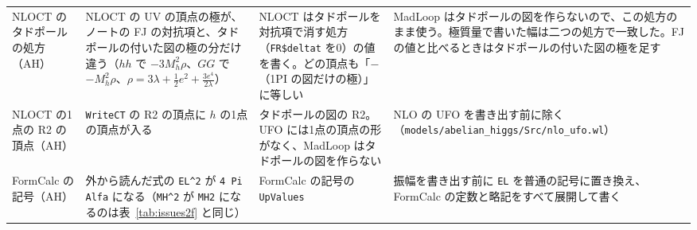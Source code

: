 \documentclass[a4paper,10pt]{ltjsarticle}
\begin{document}
\begin{table}[tbp]
\begin{tabularx}{\linewidth}{>{\raggedright\arraybackslash}p{2.4cm}>{\raggedright\arraybackslash}X>{\raggedright\arraybackslash}X>{\raggedright\arraybackslash}X}
NLOCT のタドポールの処方（AH） & NLOCT の UV の頂点の極が、ノートの FJ の対抗項と、タドポールの付いた図の極の分だけ違う（$hh$ で $-3M_h^2\rho$、$GG$ で $-M_h^2\rho$、$\rho=3\lambda+\frac12e^2+\frac{3e^4}{2\lambda}$） & NLOCT はタドポールを対抗項で消す処方（\texttt{FR\$deltat} を0）の値を書く。どの頂点も「$-$（1PI の図だけの極）」に等しい & MadLoop はタドポールの図を作らないので、この処方のまま使う。極質量で書いた幅は二つの処方で一致した。FJ の値と比べるときはタドポールの付いた図の極を足す \\
NLOCT の1点の R2 の頂点（AH） & \texttt{WriteCT} の R2 の頂点に $h$ の1点の頂点が入る & タドポールの図の R2。UFO には1点の頂点の形がなく、MadLoop はタドポールの図を作らない & NLO の UFO を書き出す前に除く（\nolinkurl{models/abelian_higgs/Src/nlo_ufo.wl}） \\
FormCalc の記号（AH） & 外から読んだ式の \texttt{EL\^{}2} が \texttt{4 Pi Alfa} になる（\texttt{MH\^{}2} が \texttt{MH2} になるのは表~\ref{tab:issues2f} と同じ） & FormCalc の記号の \texttt{UpValues} & 振幅を書き出す前に \texttt{EL} を普通の記号に置き換え、FormCalc の定数と略記をすべて展開して書く \\
\bottomrule
\end{tabularx}
\end{table}
\end{document}
